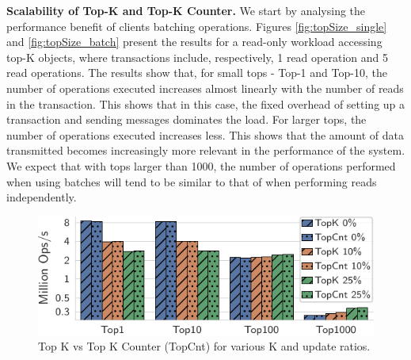 \documentclass[sigplan,twocolumn,review,anonymous]{acmart}
\begin{document}
\noindent
\textbf{Scalability of Top-K and Top-K Counter.} %
We start by analysing the performance benefit of clients batching operations. %
Figures \ref{fig:topSize_single} and \ref{fig:topSize_batch} present the results for a read-only workload accessing
top-K objects, where transactions include, respectively, 1 read operation and 5 read operations.
The results show that, for small tops - Top-1 and Top-10, the number of operations executed increases almost
linearly with the number of reads in the transaction.  This shows that in this case,  the fixed overhead of setting 
up a transaction and sending messages dominates the load. 
For larger tops, the number of operations executed increases less. This shows that the amount of data 
transmitted becomes increasingly more relevant in the performance of the system.
We expect that with tops larger than 1000, the number of operations performed when using batches will 
tend to be similar to that of when performing reads independently.


%
%
%


\begin{figure}
	\centering
	\includegraphics[width=0.76\linewidth]{singleQuery/topk_vs_topsum_5b}
	\vspace*{-0.6em}
	\caption{Top K vs Top K Counter (TopCnt) for various K and update ratios.}
	\label{fig:topKVSTopSum}
	\vspace*{-0.75em}
\end{figure}
\end{document}
